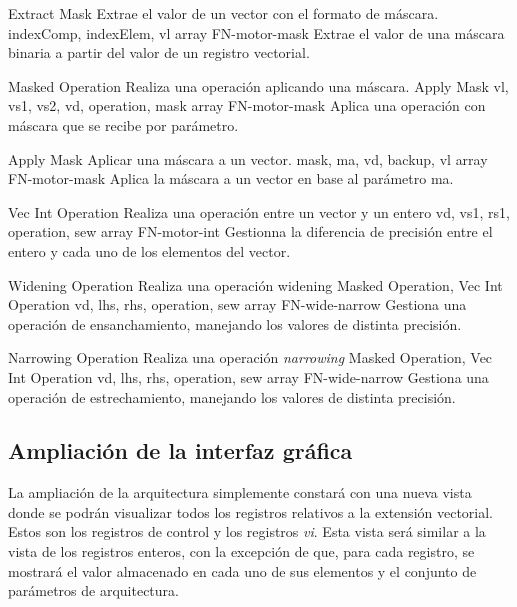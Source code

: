 \begin{component}{Extract Mask} %
{Extrae el valor de un vector con el formato de máscara.}
{\NA}
{indexComp, indexElem, vl}
{array}
{FN-motor-mask}
Extrae el valor de una máscara binaria a partir del valor de un registro vectorial.
\end{component}

\begin{component}{Masked Operation} %
{Realiza una operación aplicando una máscara.}
{Apply Mask}
{vl, vs1, vs2, vd, operation, mask}
{array}
{FN-motor-mask}
Aplica una operación con máscara que se recibe por parámetro.
\end{component}

\begin{component}{Apply Mask} %
{Aplicar una máscara a un vector.}
{\NA}
{mask, ma, vd, backup, vl}
{array}
{FN-motor-mask}
Aplica la máscara a un vector en base al parámetro ma.
\end{component}

\begin{component}{Vec Int Operation} %
{Realiza una operación entre un vector y un entero}
{\NA}
{vd, vs1, rs1, operation, sew}
{array}
{FN-motor-int}
Gestionna la diferencia de precisión entre el entero y cada uno de los elementos del vector.
\end{component}


\begin{component}{Widening Operation} %
{Realiza una operación widening}
{Masked Operation, Vec Int Operation}
{vd, lhs, rhs, operation, sew}
{array}
{FN-wide-narrow}
Gestiona una operación de ensanchamiento, manejando los valores de distinta precisión.
\end{component}

\begin{component}{Narrowing Operation} %
{Realiza una operación \textit{narrowing}}
{Masked Operation, Vec Int Operation}
{vd, lhs, rhs, operation, sew}
{array}
{FN-wide-narrow}
Gestiona una operación de estrechamiento, manejando los valores de distinta precisión.
\end{component}
\FloatBarrier

\subsection{Ampliación de la interfaz gráfica}

La ampliación de la arquitectura simplemente constará con una nueva vista donde
se podrán visualizar todos los registros relativos a la extensión vectorial.
Estos son los registros de control y los registros \textit{vi}. Esta vista será
similar a la vista de los registros enteros, con la excepción de que, para cada
registro, se mostrará el valor almacenado en cada uno de sus elementos y el
conjunto de parámetros de arquitectura.

